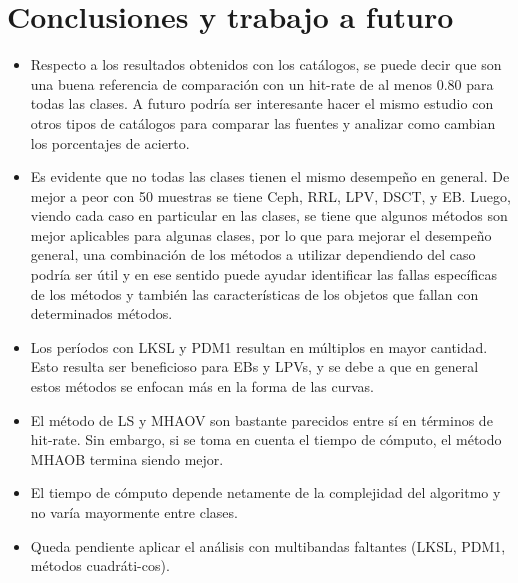 \section{Conclusiones y trabajo a futuro}

    \begin{itemize}
        \item Respecto a los resultados obtenidos con los catálogos, se puede decir que son una buena referencia de comparación con un hit-rate de al menos 0.80 para todas las clases. A futuro podría ser interesante hacer el mismo estudio con otros tipos de catálogos para comparar las fuentes y analizar como cambian los porcentajes de acierto.
        \item Es evidente que no todas las clases tienen el mismo desempeño en general. De mejor a peor con 50 muestras se tiene Ceph, RRL, LPV, DSCT, y EB. Luego, viendo cada caso en particular en las clases, se tiene que algunos métodos son mejor aplicables para algunas clases, por lo que para mejorar el desempeño general, una combinación de los métodos a utilizar dependiendo del caso podría ser útil y en ese sentido puede ayudar identificar las fallas específicas de los métodos y también las características de los objetos que fallan con determinados métodos.
        \item Los períodos con LKSL y PDM1 resultan en múltiplos en mayor cantidad. Esto resulta ser beneficioso para EBs y LPVs, y se debe a que en general estos métodos se enfocan más en la forma de las curvas.
        \item El método de LS y MHAOV son bastante parecidos entre sí en términos de hit-rate. Sin embargo, si se toma en cuenta el tiempo de cómputo, el método MHAOB termina siendo mejor.
        \item El tiempo de cómputo depende netamente de la complejidad del algoritmo y no varía mayormente entre clases.
        
        \item Queda pendiente aplicar el análisis con multibandas faltantes (LKSL, PDM1, métodos cuadráti-cos).
        
    \end{itemize}